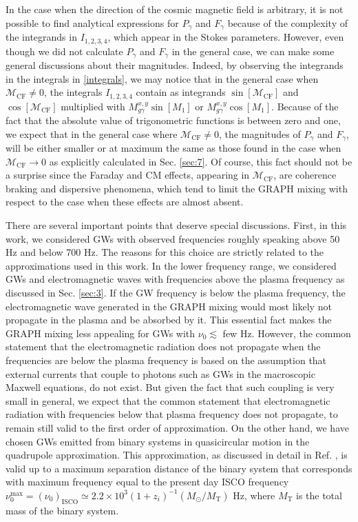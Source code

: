 \documentclass[a4paper,11pt]{article}
\begin{document}
In the case when the direction of the cosmic magnetic field is arbitrary, it is not possible to find analytical expressions for $P_\gamma$ and $F_\gamma$ because of the complexity of the integrands in $I_{1, 2, 3, 4}$, which appear in the Stokes parameters. However, even though we did not calculate $P_\gamma$ and $F_\gamma$ in the general case, we can make some general discussions about their magnitudes. Indeed, by observing the integrands in the integrals in \eqref{integrals}, we may notice that in the general case when $\mathcal M_\text{CF}\neq 0$, the integrals $I_{1, 2, 3, 4}$ contain as integrands $\sin[\mathcal M_\text{CF}]$ and $\cos[\mathcal M_\text{CF}]$ multiplied with $M_{g\gamma}^{x, y} \sin[M_1]$ or $M_{g\gamma}^{x, y} \cos[M_1]$. Because of the fact that the absolute value of trigonometric functions is between zero and one, we expect that in the general case where $\mathcal M_\text{CF}\neq 0$, the magnitudes of $P_\gamma$ and $F_\gamma$, will be either smaller or at maximum the same as those found in the case when $\mathcal M_\text{CF}\rightarrow 0$ as explicitly calculated in Sec. \ref{sec:7}. Of course, this fact should not be a surprise since the Faraday and CM effects, appearing in $\mathcal M_\text{CF}$, are coherence braking and dispersive phenomena, which tend to limit the GRAPH mixing with respect to the case when these effects are almost absent.

There are several important points that deserve special discussions. First, in this work, we considered GWs with observed frequencies roughly speaking above 50 Hz and below 700 Hz. The reasons for this choice are strictly related to the approximations used in this work. In the lower frequency range, we considered GWs and electromagnetic waves with frequencies above the plasma frequency as discussed in Sec. \ref{sec:3}. If the GW frequency is below the plasma frequency, the electromagnetic wave generated in the GRAPH mixing would most likely not propagate in the plasma and be absorbed by it. This essential fact makes the GRAPH mixing less appealing for GWs with $\nu_0\lesssim $ few Hz. However, the common statement that the electromagnetic radiation does not propagate when the frequencies are below the plasma frequency is based on the assumption that external currents that couple to photons such as GWs in the macroscopic Maxwell equations, do not exist. But given the fact that such coupling is very small in general, we expect that the common statement that electromagnetic radiation with frequencies below that plasma frequency does not propagate, to remain still valid to the first order of approximation. On the other hand, we have chosen GWs emitted from binary systems in quasicircular motion in the quadrupole approximation. This approximation, as discussed in detail in Ref. \cite{Maggiore:1900zz}, is valid up to a maximum separation distance of the binary system that corresponds with maximum frequency equal to the present day ISCO frequency $\nu_0^\text{max}=(\nu_0)_\text{ISCO}\simeq 2.2\times 10^3(1+z_i)^{-1}(M_\odot/M_\text{T})$ Hz, where $M_\text{T}$ is the total mass of the binary system.
\end{document}

